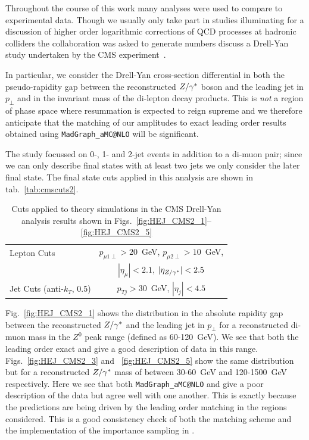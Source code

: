 		Throughout the course of this work many analyses were used to compare \hej to experimental
		data.  Though we usually only take part in studies illuminating for a discussion of higher order
		logarithmic corrections of QCD processes at hadronic colliders the \hej collaboration was asked to
		generate numbers discuss a Drell-Yan study undertaken by the CMS experiment~\cite{CMS:2014vtk}.

		In particular, we consider
		the Drell-Yan cross-section differential in both the pseudo-rapidity gap between the reconstructed
		$Z/\gamma^*$ boson and the leading jet in $p_\perp$ and in the invariant mass of the di-lepton decay
		products.  This is \emph{not} a region of phase space where resummation is expected to reign
		supreme and we therefore anticipate that the matching of our \hej amplitudes to exact leading
		order results obtained using \texttt{MadGraph\_aMC@NLO} will be significant.

		The study focussed on 0-, 1- and 2-jet events in addition to a di-muon pair; since we can
		only describe final states with at least two jets we only consider the later final state.  The
		final state cuts applied in this analysis are shown in tab.~\eqref{tab:cmscuts2}.

		\begin{table}[hbt]
		  \centering
		  \begin{tabular}{|l|c|}
		    \hline
		    Lepton Cuts & $p_{\mu1\perp}>20$~GeV, \; $p_{\mu2\perp}>10$~GeV, \\
		    & \; $|\eta_\mu|<2.1$, \; $|\eta_{Z/\gamma^*}|<2.5$ \\ \hline
		    Jet Cuts (anti-$k_T$, 0.5) & $p_{Tj}>30$~GeV, \; $|\eta_j|<4.5$ \\ \hline
		  \end{tabular}
		  \caption{Cuts applied to theory simulations in the CMS
		   Drell-Yan analysis results shown in
		    Figs.~\eqref{fig:HEJ_CMS2_1}--\eqref{fig:HEJ_CMS2_5}}
		  \label{tab:cmscuts2}
		\end{table}

		Fig.~\eqref{fig:HEJ_CMS2_1} shows the distribution in the absolute rapidity gap
		between the reconstructed $Z/\gamma^*$ and the leading jet in $p_\perp$ for a reconstructed
		di-muon mass in the $Z^0$ peak range (defined as 60-120~GeV).  We see that both the
		leading order exact and \HEJ give a good description of data in this range.
		Figs.~\eqref{fig:HEJ_CMS2_3} and ~\eqref{fig:HEJ_CMS2_5} show the same distribution
		but for a reconstructed $Z/\gamma^*$ mass of between 30-60~GeV and 120-1500~GeV respectively.
		Here we see that both \texttt{MadGraph\_aMC@NLO} and \HEJ give a poor description of the data but
		agree well with one another.  This is exactly because the \HEJ predictions are being
		driven by the leading order matching in the regions considered.  This is a good
		consistency check of both the \hej matching scheme and the implementation of the
		importance sampling in \HEJ.

